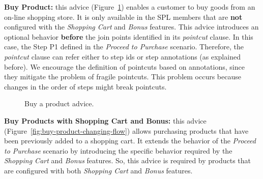 \documentclass{sig-alt-full}
\begin{document}
{\bf Buy Product:} this advice (Figure~\ref{fig:buy-product-scenario}) enables a
customer to buy goods from an on-line shopping store. It is only
available in the SPL members that are {\bf not} configured with the
\emph{Shopping Cart} and \emph{Bonus} features. This advice
introduces an optional behavior {\bf before} the join points identified in its
\emph{pointcut} clause. In this case, the Step P1 defined in the \emph{Proceed to
Purchase} scenario. Therefore, the \emph{pointcut} clause can refer either to step ids or
step annotations (as explained before). We encourage the definition of
pointcuts based on annotations, since they mitigate the problem
of fragile pointcuts. This problem occurs because changes in the order of
steps might break pointcuts.
 
\begin{figure}[h]
\caption{Buy a product advice.}
\label{fig:buy-product-scenario}
\end{figure}

{\bf Buy Products with Shopping Cart and Bonus:} this advice
(Figure~\ref{fig:buy-product-changing-flow}) allows purchasing products
that have been previously added to a shopping cart. It extends the
behavior of the \emph{Proceed to Purchase} scenario by introducing the specific
behavior required by the \emph{Shopping Cart} and
\emph{Bonus} features. So, this advice is required by products that
are configured with both \emph{Shopping Cart} and \emph{Bonus} features.
\end{document}
